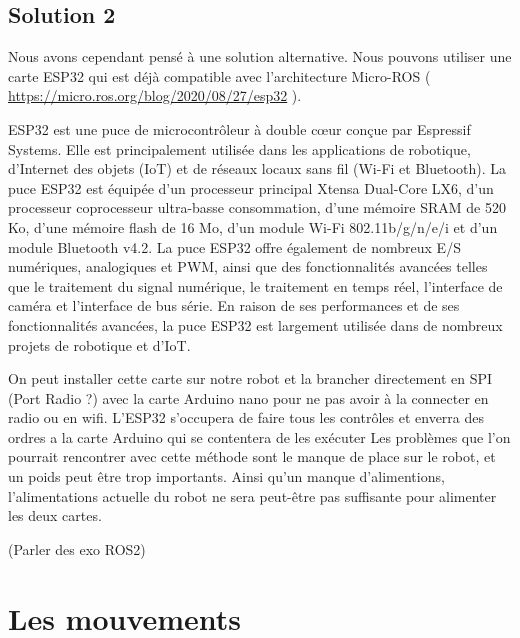 			\subsection{Solution 2}

Nous avons cependant pensé à une solution alternative. Nous pouvons utiliser une carte ESP32 qui est déjà compatible 
avec l’architecture Micro-ROS ( \url{https://micro.ros.org/blog/2020/08/27/esp32} ).  
\linebreak

ESP32 est une puce de microcontrôleur à double cœur conçue par Espressif Systems. Elle est principalement utilisée 
dans les applications de robotique, d'Internet des objets (IoT) et de réseaux locaux sans fil (Wi-Fi et Bluetooth). 
La puce ESP32 est équipée d'un processeur principal Xtensa Dual-Core LX6, d'un processeur coprocesseur ultra-basse consommation, 
d'une mémoire SRAM de 520 Ko, d'une mémoire flash de 16 Mo, d'un module Wi-Fi 802.11b/g/n/e/i et d'un module Bluetooth v4.2. 
La puce ESP32 offre également de nombreux E/S numériques, analogiques et PWM, ainsi que des fonctionnalités avancées telles 
que le traitement du signal numérique, le traitement en temps réel, l'interface de caméra et l'interface de bus série. 
En raison de ses performances et de ses fonctionnalités avancées, la puce ESP32 est largement utilisée dans de nombreux projets de 
robotique et d'IoT.
\linebreak
	
On peut installer cette carte sur notre robot et la brancher directement en SPI (Port Radio ?) avec la carte Arduino nano pour 
ne pas avoir à la connecter en radio ou en wifi.  
L’ESP32 s’occupera de faire tous les contrôles et enverra des ordres a la carte Arduino qui se contentera de les exécuter 
Les problèmes que l’on pourrait rencontrer avec cette méthode sont le manque de place sur le robot, et un poids peut être trop importants. 
Ainsi qu’un manque d’alimentions, l’alimentations actuelle du robot ne sera peut-être pas suffisante pour alimenter les deux cartes. 
\linebreak
	
(Parler des exo ROS2) 

		\section{Les mouvements}
		\label{les_mouvements}

